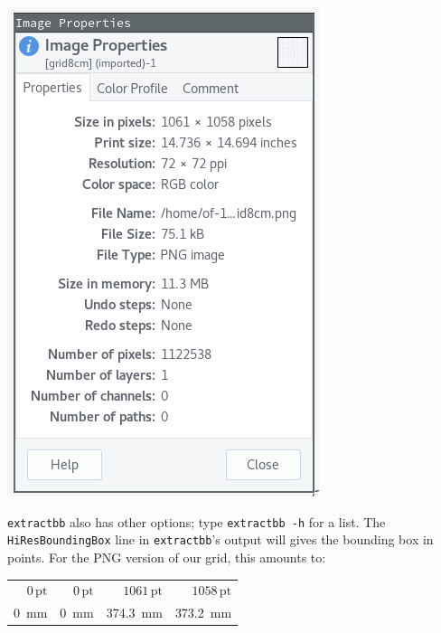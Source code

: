 \documentclass[a4paper,11pt]{article}
\newcommand\code[1]{\texttt{#1}}
\begin{document}
\begin{minipage}[t][][b]{0.3\textwidth}
\includegraphics[width=\textwidth]{images/img-props.png}
\end{minipage}

\code{extractbb} also has other options; type \code{extractbb -h} for a list.
The \code{HiResBoundingBox} line in \code{extractbb}'s output will gives the
bounding box in points\footnotemark. For the PNG version of our grid, this
amounts to:


\begin{center}
\begin{tabular}{rrrr}
    \toprule
    $0\,\mathrm{pt}$ & $0\,\mathrm{pt}$ & $1061\,\mathrm{pt}$ & $1058\,\mathrm{pt}$ \\
    \SI{0}{\milli\meter} & \SI{0}{\milli\meter} & \SI{374.3}{\milli\meter} & \SI{373.2}{\milli\meter} \\
    \bottomrule
\end{tabular}
\end{center}
\end{document}
